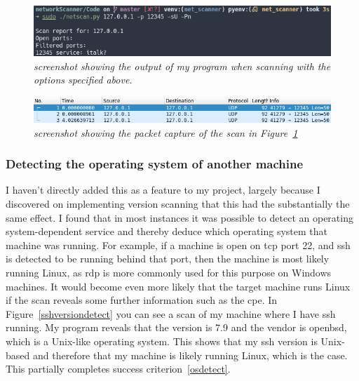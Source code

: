 \documentclass[titlepage]{article}
\let\Oldsubsubsection\subsubsection{}
\renewcommand{\subsubsection}{\FloatBarrier\Oldsubsubsection}
\begin{document}
\begin{figure}[H]
  \centering
  \includegraphics[width=\textwidth]{udpfilteredoutput.png}
  \caption{\textit{%
    screenshot showing the output of my program when scanning with the
    options specified above.
}}\label{udpfilteredoutput}
\end{figure}

\begin{figure}[H]
  \centering
  \includegraphics[width=\textwidth]{udpfilteredpcap.png}
  \caption{\textit{%
    screenshot showing the packet capture of the scan in Figure~\ref{udpfilteredoutput}
}}\label{udpfilteredpcap}
\end{figure}

\subsubsection{Detecting the operating system of another machine}
I haven't directly added this as a feature to my project, largely because
I discovered on implementing version scanning that this had the substantially the same effect.
I found that in most instances it was possible to detect an operating system-dependent
service and thereby deduce which operating system that machine was running.
For example, if a machine is open on \gls{tcp} port 22,
and \gls{ssh} is detected to be running behind that port,
then the machine is most likely running Linux, as \gls{rdp} is more commonly used
for this purpose on Windows machines.
It would become even more likely that the target machine runs Linux
if the scan reveals some further information such as the \gls{cpe}.
In Figure~\ref{sshversiondetect} you can see a scan of my machine where I have \gls{ssh} running.
My program reveals that the version is 7.9 and the vendor is openbsd, which is a Unix-like operating system.
This shows that my \gls{ssh} version is Unix-based and therefore that my machine is likely running Linux,
which is the case.
This partially completes success criterion~\ref{osdetect}.
\end{document}
